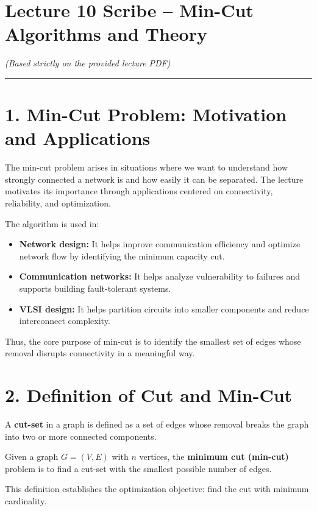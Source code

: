 \documentclass[12pt]{article}
\begin{document}
\section*{Lecture 10 Scribe – Min-Cut Algorithms and Theory }
\textit{(Based strictly on the provided lecture PDF)}

\hrule
\vspace{0.5cm}


\section*{1. Min-Cut Problem: Motivation and Applications}

The min-cut problem arises in situations where we want to understand how strongly connected a network is and how easily it can be separated. The lecture motivates its importance through applications centered on connectivity, reliability, and optimization.

The algorithm is used in:

\begin{itemize}
\item \textbf{Network design:} It helps improve communication efficiency and optimize network flow by identifying the minimum capacity cut.
\item \textbf{Communication networks:} It helps analyze vulnerability to failures and supports building fault-tolerant systems.
\item \textbf{VLSI design:} It helps partition circuits into smaller components and reduce interconnect complexity.
\end{itemize}

Thus, the core purpose of min-cut is to identify the smallest set of edges whose removal disrupts connectivity in a meaningful way.

\section*{2. Definition of Cut and Min-Cut}

A \textbf{cut-set} in a graph is defined as a set of edges whose removal breaks the graph into two or more connected components.

Given a graph $G = (V, E)$ with $n$ vertices, the \textbf{minimum cut (min-cut)} problem is to find a cut-set with the smallest possible number of edges.

This definition establishes the optimization objective: find the cut with minimum cardinality.
\end{document}
